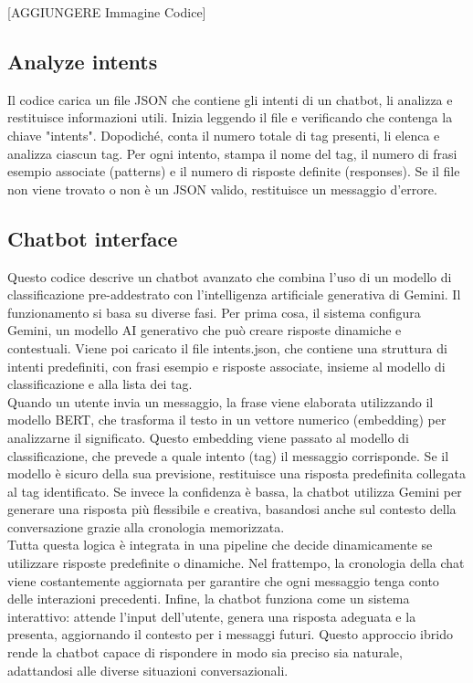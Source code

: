 \documentclass[12pt, letterpaper]{article}
\begin{document}
[AGGIUNGERE Immagine Codice]

\subsection{Analyze intents}
Il codice carica un file JSON che contiene gli intenti di un chatbot, li analizza e restituisce informazioni utili. Inizia leggendo il file e verificando che contenga la chiave "intents". Dopodiché, conta il numero totale di tag presenti, li elenca e analizza ciascun tag. Per ogni intento, stampa il nome del tag, il numero di frasi esempio associate (patterns) e il numero di risposte definite (responses). Se il file non viene trovato o non è un JSON valido, restituisce un messaggio d'errore.
\subsection{Chatbot interface}
Questo codice descrive un chatbot avanzato che combina l'uso di un modello di classificazione pre-addestrato con l'intelligenza artificiale generativa di Gemini. Il funzionamento si basa su diverse fasi. Per prima cosa, il sistema configura Gemini, un modello AI generativo che può creare risposte dinamiche e contestuali. Viene poi caricato il file intents.json, che contiene una struttura di intenti predefiniti, con frasi esempio e risposte associate, insieme al modello di classificazione e alla lista dei tag.\\
Quando un utente invia un messaggio, la frase viene elaborata utilizzando il modello BERT, che trasforma il testo in un vettore numerico (embedding) per analizzarne il significato. Questo embedding viene passato al modello di classificazione, che prevede a quale intento (tag) il messaggio corrisponde. Se il modello è sicuro della sua previsione, restituisce una risposta predefinita collegata al tag identificato. Se invece la confidenza è bassa, la chatbot utilizza Gemini per generare una risposta più flessibile e creativa, basandosi anche sul contesto della conversazione grazie alla cronologia memorizzata.\\
Tutta questa logica è integrata in una pipeline che decide dinamicamente se utilizzare risposte predefinite o dinamiche. Nel frattempo, la cronologia della chat viene costantemente aggiornata per garantire che ogni messaggio tenga conto delle interazioni precedenti. Infine, la chatbot funziona come un sistema interattivo: attende l'input dell'utente, genera una risposta adeguata e la presenta, aggiornando il contesto per i messaggi futuri. Questo approccio ibrido rende la chatbot capace di rispondere in modo sia preciso sia naturale, adattandosi alle diverse situazioni conversazionali.
\end{document}
